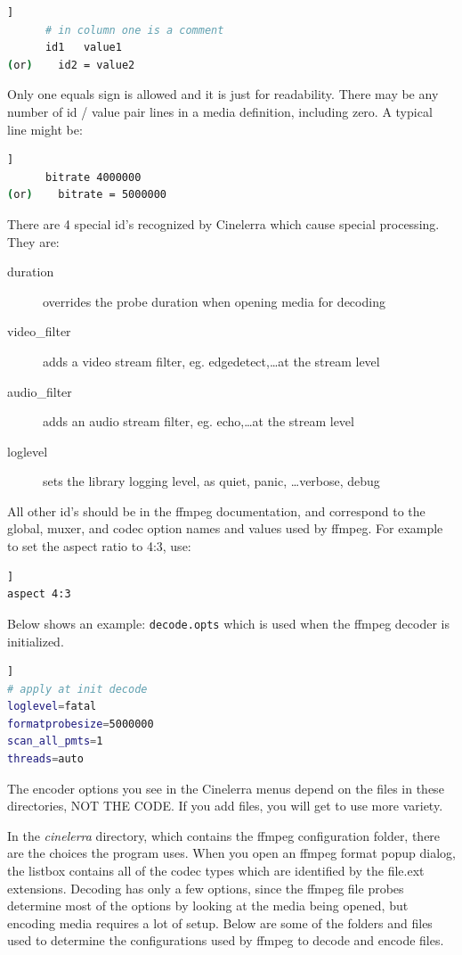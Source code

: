 \begin{lstlisting}[language=bash,numbers=none]]
      # in column one is a comment
      id1   value1
(or)	id2 = value2
\end{lstlisting}

Only one equals sign is allowed and it is just for readability.  There may be any number of id / value pair lines in a media definition, including zero. A typical line might be:

\begin{lstlisting}[language=bash,numbers=none]]
      bitrate 4000000
(or)	bitrate = 5000000
\end{lstlisting}

There are 4 special id's recognized by Cinelerra which cause special processing.  They are:

\begin{description}
    \item[duration] overrides the probe duration when opening media for decoding
    \item[video\_filter] adds a video stream filter, eg. edgedetect,\dots at the stream level
    \item[audio\_filter] adds an audio stream filter, eg. echo,\dots at the stream level
    \item[loglevel] sets the library logging level, as quiet, panic, \dots verbose, debug
\end{description}

All other id's should be in the ffmpeg documentation, and correspond to the global, muxer, and codec option names and values used by ffmpeg.  For example to set the aspect ratio to 4:3, use:

\begin{lstlisting}[language=bash,numbers=none]]
aspect 4:3
\end{lstlisting}

Below shows an example:  \texttt{decode.opts} which is used when the ffmpeg decoder is initialized.

\begin{lstlisting}[language=bash,numbers=none]]
# apply at init decode
loglevel=fatal
formatprobesize=5000000
scan_all_pmts=1
threads=auto
\end{lstlisting}

The encoder options you see in the Cinelerra menus depend on the files in these directories, \textsc{NOT THE CODE}.  If you add files, you will get to use more variety.

In the \textit{cinelerra} directory, which contains the ffmpeg configuration folder, there are the choices the program uses.  When you open an ffmpeg format popup dialog, the listbox contains all of the codec types which are identified by the file.ext extensions.  Decoding has only a few options, since the ffmpeg file probes determine most of the options by looking at the media being opened, but encoding media requires a lot of setup.  Below are some of the folders and files used to determine the configurations used by ffmpeg to decode and encode files.

